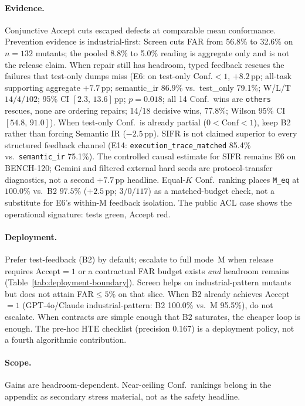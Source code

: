 \paragraph{Evidence.}
Conjunctive Accept cuts escaped defects at comparable mean conformance.
Prevention evidence is industrial-first: Screen cuts FAR from 56.8\% to
32.6\% on $n{=}132$ mutants; the pooled 8.8\% to 5.0\% reading is aggregate
only and is not the release claim.
When repair still has headroom, typed feedback rescues the failures that
test-only dumps miss (E6: on test-only Conf.${<}1$, ${+}8.2$\,pp; all-task
supporting aggregate ${+}7.7$\,pp; semantic\_ir $86.9\%$ vs.\ test\_only
79.1\%; W/L/T $14/4/102$; 95\% CI $[2.3,\,13.6]$\,pp; $p{=}0.018$;
all 14 Conf.\ wins are \texttt{others} rescues, none are ordering repairs;
14/18 decisive wins, 77.8\%; Wilson 95\% CI $[54.8,\,91.0]$).
When test-only Conf.\ is already partial ($0{<}\mathrm{Conf}{<}1$), keep B2
rather than forcing Semantic IR (${-}2.5$\,pp).
SIFR is not claimed superior to every structured feedback channel (E14:
\texttt{execution\_trace\_matched} 85.4\% vs.\ \texttt{semantic\_ir} 75.1\%).
The controlled causal estimate for SIFR remains E6 on BENCH-120; Gemini and
filtered external hard seeds are protocol-transfer diagnostics, not a second
${+}7.7$\,pp headline.
Equal-$K$ Conf.\ ranking places \texttt{M\_eq} at $100.0\%$ vs.\ B2 $97.5\%$
(${+}2.5$\,pp; $3/0/117$) as a matched-budget check, not a substitute for
E6's within-M feedback isolation.
The public ACL case shows the operational signature: tests green, Accept red.

\paragraph{Deployment.}
Prefer test-feedback (B2) by default; escalate to full mode~M when release
requires $\mathrm{Accept}{=}1$ or a contractual FAR budget exists \emph{and}
headroom remains (Table~\ref{tab:deployment-boundary}).
Screen helps on industrial-pattern mutants but does not attain FAR${\le}5\%$
on that slice.
When B2 already achieves Accept${=}1$ (GPT-4o/Claude industrial-pattern:
B2 100.0\% vs.\ M 95.5\%), do not escalate.
When contracts are simple enough that B2 saturates, the cheaper loop is enough.
The pre-hoc HTE checklist (precision 0.167) is a deployment policy, not a
fourth algorithmic contribution.

\paragraph{Scope.}
Gains are headroom-dependent.
Near-ceiling Conf.\ rankings belong in the appendix as secondary stress
material, not as the safety headline.


